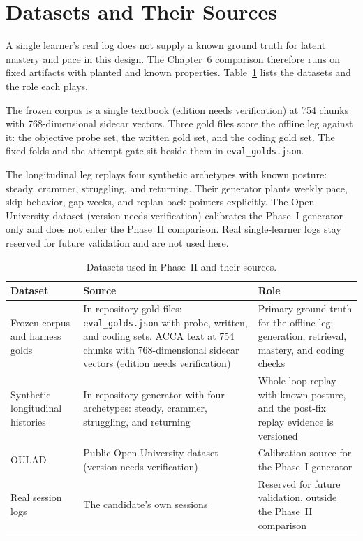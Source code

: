 \section{Datasets and Their Sources}
A single learner's real log does not supply a known ground truth for latent mastery and pace in this design. The Chapter~6 comparison therefore runs on fixed artifacts with planted and known properties. Table~\ref{tab:datasets} lists the datasets and the role each plays.

The frozen corpus is a single textbook (edition needs verification) at 754 chunks with 768-dimensional sidecar vectors. Three gold files score the offline leg against it: the objective probe set, the written gold set, and the coding gold set. The fixed folds and the attempt gate sit beside them in \texttt{eval\_golds.json}.

The longitudinal leg replays four synthetic archetypes with known posture: steady, crammer, struggling, and returning. Their generator plants weekly pace, skip behavior, gap weeks, and replan back-pointers explicitly. The Open University dataset (version needs verification) calibrates the Phase~I generator only and does not enter the Phase~II comparison. Real single-learner logs stay reserved for future validation and are not used here.

\begin{table}[htbp]
\centering
\footnotesize
\caption{Datasets used in Phase~II and their sources.}
\label{tab:datasets}
\begin{tabular}{p{3.6cm} p{3.8cm} p{5.0cm}}
\toprule
\textbf{Dataset} & \textbf{Source} & \textbf{Role} \\
\midrule
 Frozen corpus and harness golds & In-repository gold files: \texttt{eval\_golds.json} with probe, written, and coding sets. ACCA text at 754 chunks with 768-dimensional sidecar vectors (edition needs verification) & Primary ground truth for the offline leg: generation, retrieval, mastery, and coding checks \\
 Synthetic longitudinal histories & In-repository generator with four archetypes: steady, crammer, struggling, and returning & Whole-loop replay with known posture, and the post-fix replay evidence is versioned \\
 OULAD & Public Open University dataset (version needs verification) & Calibration source for the Phase~I generator \\
 Real session logs & The candidate's own sessions & Reserved for future validation, outside the Phase~II comparison \\
\bottomrule
\end{tabular}
\end{table}

